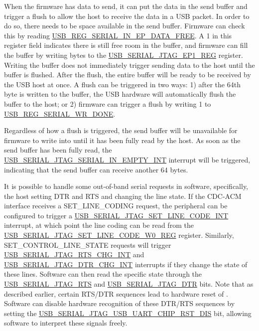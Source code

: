 \documentclass[main\_\_EN.tex]{subfiles}
\begin{document}
When the firmware has data to send, it can put the data in the send buffer and trigger a flush to allow the host to receive the data in a USB packet. In order to do so, there needs to be space available in the send buffer. Firmware can check this by reading \hyperref[fielddesc:USBSERIALJTAGSERIALINEPDATAFREE]{USB\_REG\_SERIAL\_IN\_EP\_DATA\_FREE}. A 1 in this register field indicates there is still free room in the buffer, and firmware can fill the buffer by writing bytes to the \hyperref[fielddesc:USBSERIALJTAGRDWRBYTE]{USB\_SERIAL\_JTAG\_EP1\_REG} register. Writing the buffer does not immediately trigger sending data to the host until the buffer is flushed. After the flush, the entire buffer will be ready to be received by the USB host at once. A flush can be triggered in two ways: 1) after the 64th byte is written to the buffer, the USB hardware will automatically flush the buffer to the host; or 2) firmware can trigger a flush by writing 1 to \hyperref[fielddesc:USBSERIALJTAGWRDONE]{USB\_REG\_SERIAL\_WR\_DONE}.

Regardless of how a flush is triggered, the send buffer will be unavailable for firmware to write into until it has been fully read by the host. As soon as the send buffer has been fully read, the \hyperref[fielddesc:USBSERIALJTAGSERIALINEMPTYINTRAW]{USB\_SERIAL\_JTAG\_SERIAL\_IN\_EMPTY\_INT} interrupt will be triggered, indicating that the send buffer can receive another 64 bytes.

It is possible to handle some out-of-band serial requests in software, specifically, the host setting DTR and RTS and changing the line state. If the CDC-ACM interface receives a SET\_LINE\_CODING request, the peripheral can be configured to trigger a \hyperref[int:USBSERIALJTAGSETLINECODEINT]{USB\_SERIAL\_JTAG\_SET\_LINE\_CODE\_INT} interrupt, at which point the line coding can be read from the \hyperref[regdesc:USBSERIALJTAGSETLINECODEW0REG]{USB\_SERIAL\_JTAG\_SET\_LINE\_CODE\_W0\_REG} register. Similarly, SET\_CONTROL\_LINE\_STATE requests will trigger \hyperref[int:USBSERIALJTAGRTSCHGINT]{USB\_SERIAL\_JTAG\_RTS\_CHG\_INT} and \hyperref[int:USBSERIALJTAGDTRCHGINT]{USB\_SERIAL\_JTAG\_DTR\_CHG\_INT} interrupts if they change the state of these lines. Software can then read the specific state through the \hyperref[fielddesc:USBSERIALJTAGRTS]{USB\_SERIAL\_JTAG\_RTS} and \hyperref[fielddesc:USBSERIALJTAGDTR]{USB\_SERIAL\_JTAG\_DTR} bits. Note that as described earlier, certain RTS/DTR sequences lead to hardware reset of \chipname{}. Software can disable hardware recognition of these DTR/RTS sequences by setting the \hyperref[fielddesc:USBSERIALJTAGUSBUARTCHIPRSTDIS]{USB\_SERIAL\_JTAG\_USB\_UART\_CHIP\_RST\_DIS} bit, allowing software to interpret these signals freely.
\end{document}
